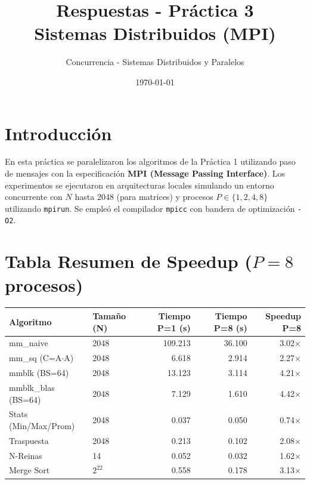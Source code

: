 \documentclass[11pt,a4paper]{article}
\title{Respuestas - Práctica 3\\Sistemas Distribuidos (MPI)}
\author{Concurrencia - Sistemas Distribuidos y Paralelos}
\date{\today}
\begin{document}
\maketitle

\section*{Introducción}
En esta práctica se paralelizaron los algoritmos de la Práctica 1 utilizando paso de mensajes con la especificación \textbf{MPI (Message Passing Interface)}. Los experimentos se ejecutaron en arquitecturas locales simulando un entorno concurrente con $N$ hasta 2048 (para matrices) y procesos $P \in \{1, 2, 4, 8\}$ utilizando \texttt{mpirun}. Se empleó el compilador \texttt{mpicc} con bandera de optimización \texttt{-O2}. 

\tableofcontents

\newpage

\section*{Tabla Resumen de Speedup ($P=8$ procesos)}

\begin{center}
\begin{tabular}{|l|l|r|r|r|}
\hline
\textbf{Algoritmo} & \textbf{Tamaño (N)} & \textbf{Tiempo P=1 (s)} & \textbf{Tiempo P=8 (s)} & \textbf{Speedup P=8} \\
\hline
mm\_naive            & 2048 & 109.213 & 36.100 & 3.02$\times$ \\
mm\_sq (C=A$\cdot$A) & 2048 & 6.618 & 2.914 & 2.27$\times$ \\
mmblk (BS=64)        & 2048 & 13.123 & 3.114 & 4.21$\times$ \\
mmblk\_blas (BS=64)  & 2048 & 7.129 & 1.610 & 4.42$\times$ \\
Stats (Min/Max/Prom) & 2048 & 0.037 & 0.050 & 0.74$\times$ \\
Traspuesta           & 2048 & 0.213 & 0.102 & 2.08$\times$ \\
N-Reinas             & 14   & 0.052 & 0.032 & 1.62$\times$ \\
Merge Sort           & $2^{22}$ & 0.558 & 0.178 & 3.13$\times$ \\
\hline
\end{tabular}
\end{center}

\newpage
\end{document}

